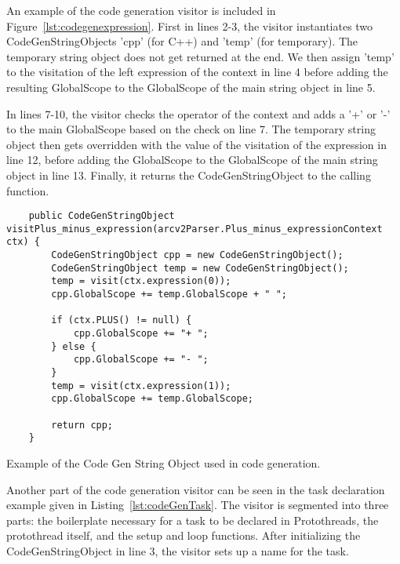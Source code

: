 An example of the code generation visitor is included in Figure~\ref{lst:codegenexpression}. First in lines 2-3, the visitor instantiates two CodeGenStringObjects 'cpp' (for C++) and 'temp' (for temporary). The temporary string object does not get returned at the end. We then assign 'temp' to the visitation of the left expression of the context in line 4 before adding the resulting GlobalScope to the GlobalScope of the main string object in line 5.

In lines 7-10, the visitor checks the operator of the context and adds a '+' or '-' to the main GlobalScope based on the check on line 7. The temporary string object then gets overridden with the value of the visitation of the expression in line 12, before adding the GlobalScope to the GlobalScope of the main string object in line 13. Finally, it returns the CodeGenStringObject to the calling function.


\begin{listing}[htb!]
    \begin{verbatim}
    public CodeGenStringObject visitPlus_minus_expression(arcv2Parser.Plus_minus_expressionContext ctx) {
        CodeGenStringObject cpp = new CodeGenStringObject();
        CodeGenStringObject temp = new CodeGenStringObject();
        temp = visit(ctx.expression(0));
        cpp.GlobalScope += temp.GlobalScope + " ";

        if (ctx.PLUS() != null) {
            cpp.GlobalScope += "+ ";
        } else {
            cpp.GlobalScope += "- ";
        }
        temp = visit(ctx.expression(1));
        cpp.GlobalScope += temp.GlobalScope;

        return cpp;
    }
    \end{verbatim}
    \caption{Example of the Code Gen String Object used in code generation.}
    \label{lst:codegenexpression}
\end{listing}


Another part of the code generation visitor can be seen in the task declaration example given in Listing~\ref{lst:codeGenTask}. The visitor is segmented into three parts: the boilerplate necessary for a task to be declared in Protothreads, the protothread itself, and the setup and loop functions. After initializing the CodeGenStringObject in line 3, the visitor sets up a name for the task.


